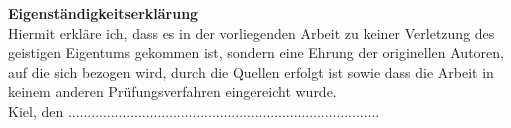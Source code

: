 \vspace*{\fill}
\huge
\textbf{\textsf{Eigenständigkeitserklärung}}\\

\normalsize
Hiermit erkläre ich, dass es in der vorliegenden Arbeit zu keiner Verletzung des geistigen Eigentums gekommen ist, sondern eine Ehrung der originellen Autoren, auf die sich bezogen wird, durch die Quellen erfolgt ist sowie dass die Arbeit in keinem anderen Prüfungsverfahren eingereicht wurde.\\

Kiel, den ....................\quad\quad\quad............................................................